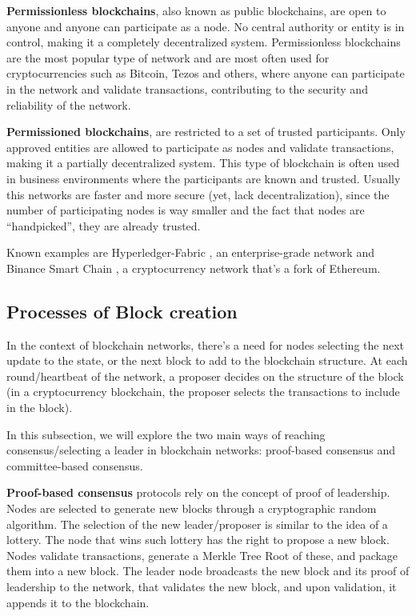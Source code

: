 \textbf{Permissionless blockchains}, also known as public blockchains, are open to anyone and anyone can participate as a node. No central authority or entity is in control, making it a completely decentralized system. Permissionless blockchains are the most popular type of network and are most often used for cryptocurrencies such as Bitcoin, Tezos and others, where anyone can participate in the network and validate transactions, contributing to the security and reliability of the network.

\textbf{Permissioned blockchains}, are restricted to a set of trusted participants. Only approved entities are allowed to participate as nodes and validate transactions, making it a partially decentralized system. This type of blockchain is often used in business environments where the participants are known and trusted. Usually this networks are faster and more secure (yet, lack decentralization), since the number of participating nodes is way smaller and the fact that nodes are ``handpicked'', they are already trusted.

Known examples are Hyperledger-Fabric \cite{androulaki2018hyperledger}, an enterprise-grade network and Binance Smart Chain \cite{bnb-chain_2022}, a cryptocurrency network that's a fork of Ethereum.

\subsection*{Processes of Block creation}
In the context of blockchain networks, there's a need for nodes selecting the next update to the state, or the next block to add to the blockchain structure. At each round/heartbeat of the network, a proposer decides on the structure of the block (in a cryptocurrency blockchain, the proposer selects the transactions to include in the block).

In this subsection, we will explore the two main ways of reaching consensus/selecting a leader in blockchain networks: proof-based consensus and committee-based consensus.

\textbf{Proof-based consensus} protocols rely on the concept of proof of leadership. Nodes are selected to generate new blocks through a cryptographic random algorithm. The selection of the new leader/proposer is similar to the idea of a lottery. The node that wins such lottery has the right to propose a new block.
Nodes validate transactions, generate a Merkle Tree Root of these, and package them into a new block. The leader node broadcasts the new block and its proof of leadership to the network, that validates the new block, and upon validation, it appends it to the blockchain.


